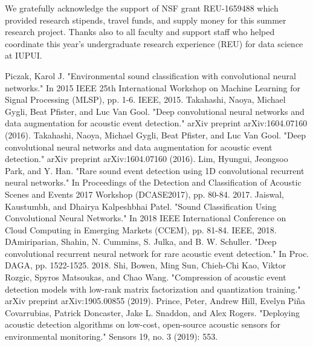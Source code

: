 \documentclass[conference]{IEEEtran}
\begin{document}
We gratefully acknowledge the support of NSF grant REU-1659488 which provided research stipends, travel funds, and supply money for this summer research project. Thanks also to all faculty and support staff who helped coordinate this year's undergraduate research experience (REU) for data science at IUPUI.

\begin{thebibliography}{00}
 Piczak, Karol J. "Environmental sound classification with convolutional neural networks." In 2015 IEEE 25th International Workshop on Machine Learning for Signal Processing (MLSP), pp. 1-6. IEEE, 2015.
 Takahashi, Naoya, Michael Gygli, Beat Pfister, and Luc Van Gool. "Deep convolutional neural networks and data augmentation for acoustic event detection." arXiv preprint arXiv:1604.07160 (2016).
 Takahashi, Naoya, Michael Gygli, Beat Pfister, and Luc Van Gool. "Deep convolutional neural networks and data augmentation for acoustic event detection." arXiv preprint arXiv:1604.07160 (2016).
 Lim, Hyungui, Jeongsoo Park, and Y. Han. "Rare sound event detection using 1D convolutional recurrent neural networks." In Proceedings of the Detection and Classification of Acoustic Scenes and Events 2017 Workshop (DCASE2017), pp. 80-84. 2017.
 Jaiswal, Kaustumbh, and Dhairya Kalpeshbhai Patel. "Sound Classification Using Convolutional Neural Networks." In 2018 IEEE International Conference on Cloud Computing in Emerging Markets (CCEM), pp. 81-84. IEEE, 2018.
 DAmiriparian, Shahin, N. Cummins, S. Julka, and B. W. Schuller. "Deep convolutional recurrent neural network for rare acoustic event detection." In Proc. DAGA, pp. 1522-1525. 2018.
 Shi, Bowen, Ming Sun, Chieh-Chi Kao, Viktor Rozgic, Spyros Matsoukas, and Chao Wang. "Compression of acoustic event detection models with low-rank matrix factorization and quantization training." arXiv preprint arXiv:1905.00855 (2019).
 Prince, Peter, Andrew Hill, Evelyn Piña Covarrubias, Patrick Doncaster, Jake L. Snaddon, and Alex Rogers. "Deploying acoustic detection algorithms on low-cost, open-source acoustic sensors for environmental monitoring." Sensors 19, no. 3 (2019): 553.
\end{thebibliography}
\end{document}
